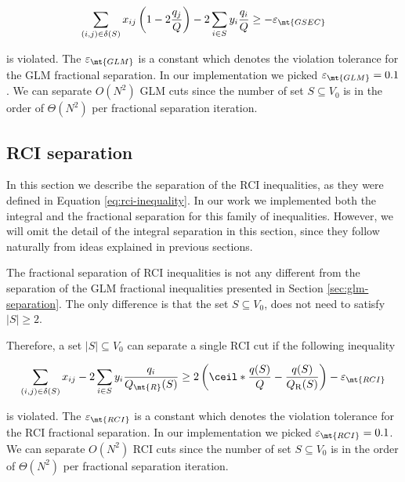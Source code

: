 \begin{equation}
	\begin{split}
		\sum_{(i, j) \in \delta(S)} x_{ij} \left( 1 - 2 \frac{q_j}{Q} \right)  -2 \sum_{i \in S} y_i \frac{q_i}{Q}  \ge  - \varepsilon_{\mt{GSEC}}
	\end{split}
\end{equation}

is violated.
The $\varepsilon_{\mt{GLM}}$ is a constant which denotes the violation tolerance for the GLM fractional separation.
In our implementation we picked $\varepsilon_{\mt{GLM}} = 0.1$.
We can separate $O(N^2)$ GLM cuts since the number of set $S \subseteq V_0$ is in the order of $\Theta(N^2)$ per fractional separation iteration.


\subsection{RCI separation}\label{sec:rci-separation}
In this section we describe the separation of the RCI inequalities, as they were defined in Equation \eqref{eq:rci-inequality}.
In our work we implemented both the integral and the fractional separation for this family of inequalities.
However, we will omit the detail of the integral separation in this section, since they follow naturally from ideas explained in previous sections.

The fractional separation of RCI inequalities is not any different from the separation of the GLM fractional inequalities presented in Section \ref{sec:glm-separation}.
The only difference is that the set $S \subseteq V_0$, does not need to satisfy $|S| \ge 2$.

Therefore, a set $|S| \subseteq V_0$ can separate a single RCI cut if the following inequality

\begin{equation}
	\begin{split}
		\sum_{(i, j) \in \delta(S)} x_{ij} -2 \sum_{i \in S} y_i {\frac{q_i}{Q_\mt{R}(S)}}    \ge   2 \left( \ceil*{ \frac{q(S)}{Q}} - \frac{q(S)}{Q_{\mathrm{R}}(S)} \right) - \varepsilon_{\mt{RCI}}
	\end{split}
\end{equation}

is violated.
The $\varepsilon_{\mt{RCI}}$ is a constant which denotes the violation tolerance for the RCI fractional separation.
In our implementation we picked $\varepsilon_{\mt{RCI}} = 0.1$.
We can separate $O(N^2)$ RCI cuts since the number of set $S \subseteq V_0$ is in the order of $\Theta(N^2)$ per fractional separation iteration.
